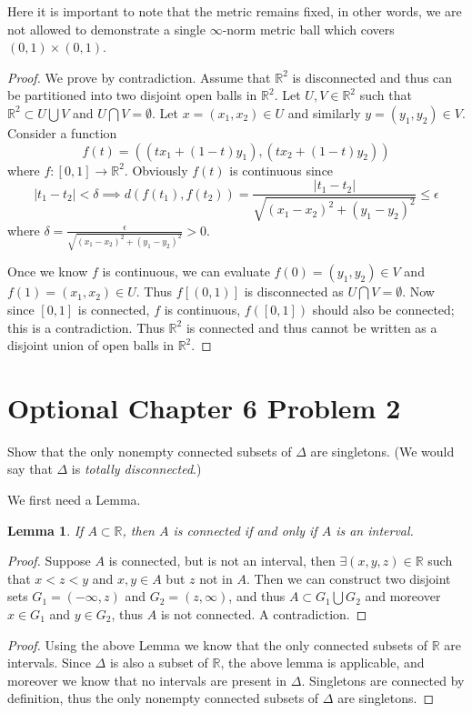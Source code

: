 \documentclass{article}
\newtheorem{lem}{Lemma}
\newtheorem{proof}{Proof}
\def\le{\leqslant}
\def\to{\rightarrow}
\def\RR{\mathbb R}
\begin{document}
Here it is important to note that the metric remains fixed, in
other words, we are not allowed to
 demonstrate a single $\infty$-norm metric ball
which covers $(0,1)\times(0,1)$.
\begin{proof}
We prove by contradiction. Assume that $\RR^2$ is disconnected
and thus can be partitioned into two disjoint open balls
in $\RR^2$.
Let $U,V \in \RR^2$ such that $\RR^2 \subset U \bigcup V$ and
$U\bigcap V=\emptyset$. Let $x=(x_1,x_2)\in U$ and similarly
$y=(y_1,y_2)\in V$. Consider a function 
\[
f(t)=((tx_1+(1-t)y_1), (tx_2+(1-t)y_2))
\] where $f:[0,1]\to \RR^2$. Obviously $f(t)$ is continuous
since
\[
|t_1-t_2|< \delta \implies d(f(t_1),f(t_2)) = 
\frac{|t_1-t_2|}{\sqrt{(x_1-x_2)^2+(y_1-y_2)^2}} \le \epsilon
\]
where $\delta = \frac{\epsilon}{\sqrt{(x_1-x_2)^2+(y_1-y_2)^2}}>0$.

Once we know $f$ is continuous, we can
evaluate $f(0)=(y_1,y_2)\in V$ and $f(1)=(x_1,x_2)\in U$.
Thus $f[(0,1)]$ is disconnected as $U\bigcap V=\emptyset$.
Now since $[0,1]$ is connected, $f$ is continuous, $f([0,1])$
should also be connected; this is a contradiction. Thus $\RR^2$
is connected and thus cannot be written as a disjoint union of
open balls in $\RR^2$.
\end{proof}

\section{Optional Chapter 6 Problem 2}
Show that the only nonempty connected subsets of $\Delta$ are
singletons. (We would say that $\Delta$ is \emph{totally 
disconnected}.)

We first need a Lemma.
\begin{lem}
If $A\subset \RR$, then $A$ is connected if and only if $A$
is an interval.
\end{lem}

\begin{proof}
Suppose $A$ is connected, but is not an interval, then 
$\exists (x,y,z)\in \RR$ such that $x<z<y$ and $x,y\in A$ but
$z$ not in $A$. Then we can construct two disjoint sets $G_1=(-\infty,z)$
and $G_2=(z,\infty)$, and thus $A\subset G_1\bigcup G_2$ and
moreover $x\in G_1$ and $y \in G_2$, thus $A$
is not connected. A contradiction.
\end{proof}
\begin{proof}
Using the above Lemma we know that the only connected subsets of $\RR$
are intervals. Since $\Delta$ is also a subset of $\RR$, the above
lemma is applicable, and moreover we know that no intervals are
present in $\Delta$. Singletons are connected by definition, thus
the only nonempty connected subsets of $\Delta$ are
singletons.

\end{proof}
\end{document}

